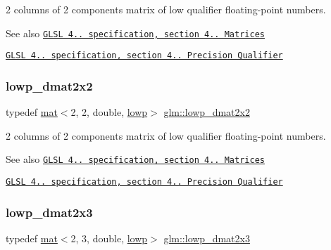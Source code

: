2 columns of 2 components matrix of low qualifier floating-\/point numbers.

\begin{DoxySeeAlso}{See also}
\href{http://www.opengl.org/registry/doc/GLSLangSpec.4.20.8.pdf}{\tt G\+L\+SL 4.. specification, section 4.. Matrices} 

\href{http://www.opengl.org/registry/doc/GLSLangSpec.4.20.8.pdf}{\tt G\+L\+SL 4.. specification, section 4.. Precision Qualifier} 
\end{DoxySeeAlso}
\mbox{\label{group__core__precision_gaa0f01b1fb1a32ca63036ee3de89681d4}} 
\subsubsection{\texorpdfstring{lowp\+\_\+dmat2x2}{lowp\_dmat2x2}}
{\footnotesize\ttfamily typedef \mbox{\hyperlink{structglm_1_1mat}{mat}}$<$2, 2, double, \mbox{\hyperlink{namespaceglm_a36ed105b07c7746804d7fdc7cc90ff25ae161af3fc695e696ce3bf69f7332bc2d}{lowp}}$>$ \mbox{\hyperlink{group__core__precision_gaa0f01b1fb1a32ca63036ee3de89681d4}{glm\+::lowp\+\_\+dmat2x2}}}

2 columns of 2 components matrix of low qualifier floating-\/point numbers.

\begin{DoxySeeAlso}{See also}
\href{http://www.opengl.org/registry/doc/GLSLangSpec.4.20.8.pdf}{\tt G\+L\+SL 4.. specification, section 4.. Matrices} 

\href{http://www.opengl.org/registry/doc/GLSLangSpec.4.20.8.pdf}{\tt G\+L\+SL 4.. specification, section 4.. Precision Qualifier} 
\end{DoxySeeAlso}
\mbox{\label{group__core__precision_gae5263863de4793ff33184db9a6bd3620}} 
\subsubsection{\texorpdfstring{lowp\+\_\+dmat2x3}{lowp\_dmat2x3}}
{\footnotesize\ttfamily typedef \mbox{\hyperlink{structglm_1_1mat}{mat}}$<$2, 3, double, \mbox{\hyperlink{namespaceglm_a36ed105b07c7746804d7fdc7cc90ff25ae161af3fc695e696ce3bf69f7332bc2d}{lowp}}$>$ \mbox{\hyperlink{group__core__precision_gae5263863de4793ff33184db9a6bd3620}{glm\+::lowp\+\_\+dmat2x3}}}

